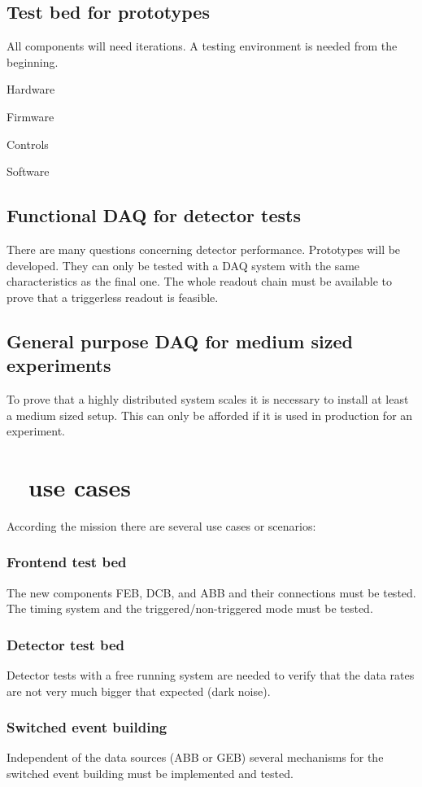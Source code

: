 \subsection{Test bed for prototypes}
All components will need iterations. A testing environment is
needed from the beginning.
\begin{compactitem}[$\bullet$]
\item Hardware
\item Firmware
\item Controls
\item Software
\end{compactitem}
\subsection{Functional DAQ for detector tests}
There are many questions concerning detector performance.
Prototypes will be developed. They can only be tested with a DAQ
system with the same characteristics as the final one. The whole
readout chain must be available to prove that a triggerless
readout is feasible.
\subsection{General purpose DAQ for medium sized experiments}
To prove that a highly distributed system scales it is necessary
to install at least a medium sized setup. This can only be
afforded if it is used in production for an experiment.

\section{\DDA~ use cases}
According the mission there are several use cases or scenarios:
\subsubsection{Frontend test bed}
The new components FEB, DCB, and ABB and their connections must be tested.
The timing system and the triggered/non-triggered mode must be tested.
\subsubsection{Detector test bed}
Detector tests with a free running system are needed to verify that the data rates
are not very much bigger that expected (dark noise).
\subsubsection{Switched event building}
Independent of the data sources (ABB or GEB) several mechanisms for the switched
event building must be implemented and tested.

